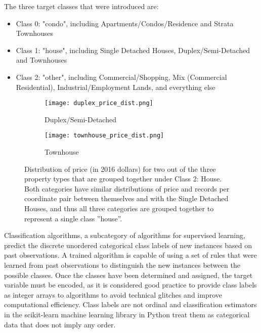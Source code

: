 \vspace{5mm}

The three target classes that were introduced are:

\begin{itemize}
    \item Class 0: "condo", including Apartments/Condos/Residence and Strata Townhouses
    \item Class 1: "house", including Single Detached Houses, Duplex/Semi-Detached and Townhouses
    \item Class 2: "other", including Commercial/Shopping, Mix (Commercial Residential), Industrial/Employment Lands, and everything else
\end{itemize}

\begin{figure}[ht]
    \centering
    \begin{subfigure}{\linewidth}
        \centering
        \texttt{[image: duplex\_price\_dist.png]}
        \label{fig:duplex_price_dist}
        \caption{Duplex/Semi-Detached}
    \end{subfigure}

    \begin{subfigure}{\linewidth}
        \centering
        \texttt{[image: townhouse\_price\_dist.png]}
        \label{fig:townhouse_price_dist}
        \caption{Townhouse}
    \end{subfigure}
    \caption{Distribution of price (in 2016 dollars) for two out of the three property types that are grouped together under Class 2: House.
    Both categories have similar distributions of price and records per coordinate pair between themselves and with the Single Detached Houses, and thus all three categories are grouped together to represent a single class ''house''.}
    \label{fig:class_2_price_dist}
\end{figure}

Classification algorithms, a subcategory of algorithms for supervised learning, predict the discrete unordered categorical class labels of new instances based on past observations.
A trained algorithm is capable of using a set of rules that were learned from past observations to distinguish the new instances between the possible classes.
Once the classes have been determined and assigned, the target variable must be encoded, as it is considered good practice to provide class labels as integer arrays to algorithms to avoid technical glitches and improve computational efficiency.
Class labels are not ordinal and classification estimators in the scikit-learn\cite{scikit-learn} machine learning library in Python treat them as categorical data that does not imply any order.

